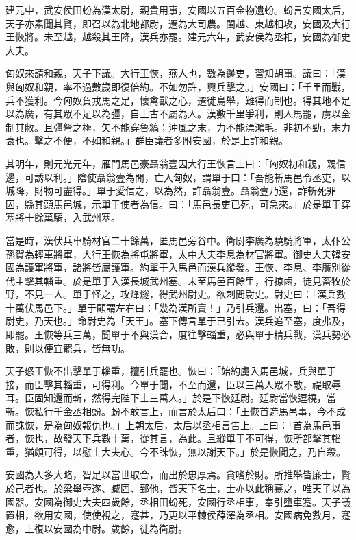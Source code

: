 \begin{pinyinscope}
建元中，武安侯田蚡為漢太尉，親貴用事，安國以五百金物遺蚡。蚡言安國太后，天子亦素聞其賢，即召以為北地都尉，遷為大司農。閩越、東越相攻，安國及大行王恢將。未至越，越殺其王降，漢兵亦罷。建元六年，武安侯為丞相，安國為御史大夫。

匈奴來請和親，天子下議。大行王恢，燕人也，數為邊吏，習知胡事。議曰：「漢與匈奴和親，率不過數歲即復倍約。不如勿許，興兵擊之。」安國曰：「千里而戰，兵不獲利。今匈奴負戎馬之足，懷禽獸之心，遷徙鳥舉，難得而制也。得其地不足以為廣，有其眾不足以為彊，自上古不屬為人。漢數千里爭利，則人馬罷，虜以全制其敝。且彊弩之極，矢不能穿魯縞；沖風之末，力不能漂鴻毛。非初不勁，末力衰也。擊之不便，不如和親。」群臣議者多附安國，於是上許和親。

其明年，則元光元年，雁門馬邑豪聶翁壹因大行王恢言上曰：「匈奴初和親，親信邊，可誘以利。」陰使聶翁壹為閒，亡入匈奴，謂單于曰：「吾能斬馬邑令丞吏，以城降，財物可盡得。」單于愛信之，以為然，許聶翁壹。聶翁壹乃還，詐斬死罪囚，縣其頭馬邑城，示單于使者為信。曰：「馬邑長吏已死，可急來。」於是單于穿塞將十餘萬騎，入武州塞。

當是時，漢伏兵車騎材官二十餘萬，匿馬邑旁谷中。衛尉李廣為驍騎將軍，太仆公孫賀為輕車將軍，大行王恢為將屯將軍，太中大夫李息為材官將軍。御史大夫韓安國為護軍將軍，諸將皆屬護軍。約單于入馬邑而漢兵縱發。王恢、李息、李廣別從代主擊其輜重。於是單于入漢長城武州塞。未至馬邑百餘里，行掠鹵，徒見畜牧於野，不見一人。單于怪之，攻烽燧，得武州尉史。欲刺問尉史。尉史曰：「漢兵數十萬伏馬邑下。」單于顧謂左右曰：「幾為漢所賣！」乃引兵還。出塞，曰：「吾得尉史，乃天也。」命尉史為「天王」。塞下傳言單于已引去。漢兵追至塞，度弗及，即罷。王恢等兵三萬，聞單于不與漢合，度往擊輜重，必與單于精兵戰，漢兵勢必敗，則以便宜罷兵，皆無功。

天子怒王恢不出擊單于輜重，擅引兵罷也。恢曰：「始約虜入馬邑城，兵與單于接，而臣擊其輜重，可得利。今單于聞，不至而還，臣以三萬人眾不敵，禔取辱耳。臣固知還而斬，然得完陛下士三萬人。」於是下恢廷尉。廷尉當恢逗橈，當斬。恢私行千金丞相蚡。蚡不敢言上，而言於太后曰：「王恢首造馬邑事，今不成而誅恢，是為匈奴報仇也。」上朝太后，太后以丞相言告上。上曰：「首為馬邑事者，恢也，故發天下兵數十萬，從其言，為此。且縱單于不可得，恢所部擊其輜重，猶頗可得，以慰士大夫心。今不誅恢，無以謝天下。」於是恢聞之，乃自殺。

安國為人多大略，智足以當世取合，而出於忠厚焉。貪嗜於財。所推舉皆廉士，賢於己者也。於梁舉壺遂、臧固、郅他，皆天下名士，士亦以此稱慕之，唯天子以為國器。安國為御史大夫四歲餘，丞相田蚡死，安國行丞相事，奉引墮車蹇。天子議置相，欲用安國，使使視之，蹇甚，乃更以平棘侯薛澤為丞相。安國病免數月，蹇愈，上復以安國為中尉。歲餘，徙為衛尉。


\end{pinyinscope}
